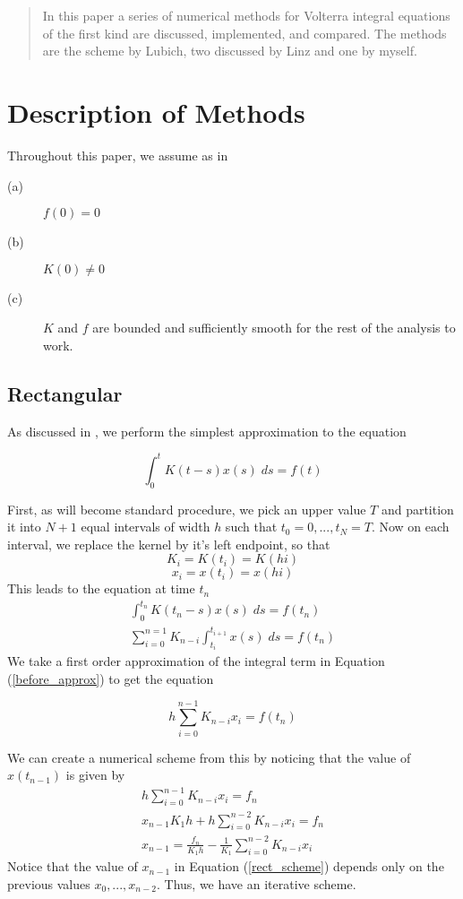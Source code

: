 \documentclass[11pt]{article}
\numberwithin{equation}{section}
\theoremstyle{definition}
\newcommand{\eqn}[2]{
  \begin{equation}
    \label{#1}
    #2
  \end{equation}
}
\newcommand{\eqr}[1]{Equation (\ref{#1})}
\begin{document}
\maketitle
\begin{abstract}
In this paper a series of numerical methods for Volterra integral equations of
the first kind are discussed, implemented, and compared. The methods are the
scheme by Lubich, two discussed by Linz and one by myself.
\end{abstract}
\setcounter{tocdepth}{2}
\tableofcontents
\lstlistoflistings
\listoftables
\section{Description of Methods}
Throughout this paper, we assume as in \cite{linz}
\begin{description}
\item[(a)] $f(0) = 0$
\item[(b)] $K(0) \neq 0$
\item[(c)] $K$ and $f$ are bounded and sufficiently smooth for the rest of the 
analysis to work.
\end{description}
\subsection{Rectangular}
As discussed in \cite{linz}, we perform the simplest approximation to the equation
\eqn{rect_base}{
  \int_0^t K(t - s)x(s)\; ds = f(t)
}
First, as will become standard procedure, we pick an upper value $T$ and partition
it into $N+1$ equal intervals of width $h$ such that $t_0 = 0, ..., t_N = T$. Now
on each interval, we replace the kernel by it's left endpoint, so that
$$
  K_i = K(t_i) = K(hi)
$$
$$
  x_i = x(t_i) = x(hi)
$$
This leads to the equation at time $t_n$
\begin{eqnarray}
\nonumber              \int_0^{t_n} K(t_n - s)x(s)\; ds = f(t_n) \\
\label{before_approx}  \sum_{i=0}^{n=1} K_{n-i} \int_{t_i}^{t_{i+1}} x(s)\; ds = f(t_n)
\end{eqnarray}
We take a first order approximation of the integral term in \eqr{before_approx}
to get the equation
\eqn{rect_discrete}{
  h\sum_{i=0}^{n-1} K_{n-i} x_i = f(t_n)
}
We can create a numerical scheme from this by noticing that the value of $x(t_{n-1})$
is given by
\begin{eqnarray}
\nonumber            h \sum_{i=0}^{n-1} K_{n-i} x_i = f_n \\
\nonumber            x_{n-1} K_1 h + h\sum_{i=0}^{n-2} K_{n-i}x_i = f_n \\
\label{rect_scheme}  x_{n-1} = \frac{f_n}{K_1 h} - \frac{1}{K_1} \sum_{i=0}^{n-2} K_{n-i} x_i
\end{eqnarray}
Notice that the value of $x_{n-1}$ in \eqr{rect_scheme} depends only on the previous
values $x_0, ..., x_{n-2}$. Thus, we have an iterative scheme.
\end{document}
